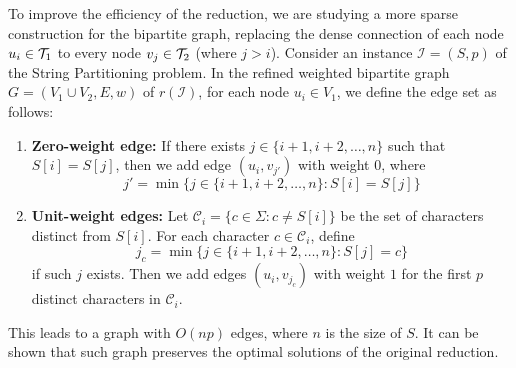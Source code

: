 To improve the efficiency of the reduction, we are studying a more sparse construction for the bipartite graph, replacing the dense connection of each node $u_i \in \mathcal{T}_{1}$ to every node $v_j \in \mathcal{T}_{2}$ (where $j>i$). Consider an instance $\mathcal{I}=(S,p)$ of the String Partitioning problem. In the refined weighted bipartite graph $G = (V_1 \cup V_2, E, w)$ of $r(\mathcal{I})$, for each node $u_i \in V_1$, we define the edge set as follows:
\begin{enumerate}
    \item \textbf{Zero-weight edge:} If there exists $j \in \{i+1, i+2, \ldots, n\}$ such that $S[i] = S[j]$, then we add edge $(u_i, v_{j'})$ with weight $0$, where
    $$j' = \min\{j \in \{i+1, i+2, \ldots, n\} : S[i] = S[j]\}$$
    
    \item \textbf{Unit-weight edges:} Let $\mathcal{C}_i = \{c \in \Sigma : c \neq S[i]\}$ be the set of characters distinct from $S[i]$. For each character $c \in \mathcal{C}_i$, define
    $$j_c = \min\{j \in \{i+1, i+2, \ldots, n\} : S[j] = c\}$$
    if such $j$ exists. Then we add edges $(u_i, v_{j_c})$ with weight $1$ for the first $p$ distinct characters in $\mathcal{C}_i$.
\end{enumerate}
This leads to a graph with $O(np)$ edges, where $n$ is the size of $S$. It can be shown that such graph preserves the optimal solutions of the original reduction. 

